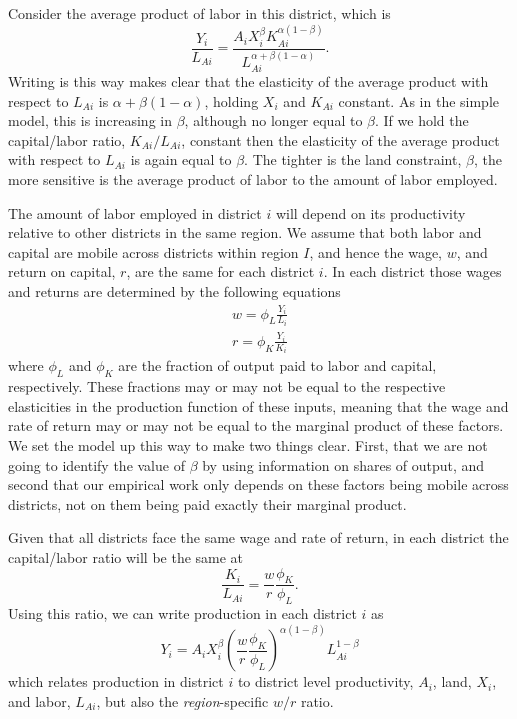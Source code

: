 \documentclass[11pt]{article}
\begin{document}
Consider the average product of labor in this district, which is
\begin{equation}
	\frac{Y_i}{L_{Ai}} = \frac{A_{i} X_{i}^{\beta} K_{Ai}^{\alpha(1-\beta)}}{L_{Ai}^{\alpha + \beta(1-\alpha)}}.
\end{equation}
Writing is this way makes clear that the elasticity of the average product with respect to $L_{Ai}$ is $\alpha + \beta(1-\alpha)$, holding $X_i$ and $K_{Ai}$ constant. As in the simple model, this is increasing in $\beta$, although no longer equal to $\beta$.  If we hold the capital/labor ratio, $K_{Ai}/L_{Ai}$, constant then the elasticity of the average product with respect to $L_{Ai}$ is again equal to $\beta$. The tighter is the land constraint, $\beta$, the more sensitive is the average product of labor to the amount of labor employed.

The amount of labor employed in district $i$ will depend on its productivity relative to other districts in the same region. We assume that both labor and capital are mobile across districts within region $I$, and hence the wage, $w$, and return on capital, $r$, are the same for each district $i$. In each district those wages and returns are determined by the following equations
\begin{eqnarray}
    w = \phi_L \frac{Y_i}{L_i} \\ \nonumber
    r = \phi_K \frac{Y_i}{K_i} \label{EQ_factorprices}
\end{eqnarray}
where $\phi_L$ and $\phi_K$ are the fraction of output paid to labor and capital, respectively. These fractions may or may not be equal to the respective elasticities in the production function of these inputs, meaning that the wage and rate of return may or may not be equal to the marginal product of these factors. We set the model up this way to make two things clear. First, that we are not going to identify the value of $\beta$ by using information on shares of output, and second that our empirical work only depends on these factors being mobile across districts, not on them being paid exactly their marginal product.

Given that all districts face the same wage and rate of return, in each district the capital/labor ratio will be the same at
\begin{equation}
    \frac{K_i}{L_{Ai}} = \frac{w}{r}\frac{\phi_K}{\phi_L}.
\end{equation}
Using this ratio, we can write production in each district $i$ as
\begin{equation}
Y_{i} = A_{i} X_{i}^{\beta} \left(\frac{w}{r}\frac{\phi_K}{\phi_L}\right)^{\alpha(1-\beta)} L_{Ai}^{1-\beta} \label{EQ_prodwr}
\end{equation}
which relates production in district $i$ to district level productivity, $A_i$, land, $X_i$, and labor, $L_{Ai}$, but also the \textit{region}-specific $w/r$ ratio.
\end{document}
